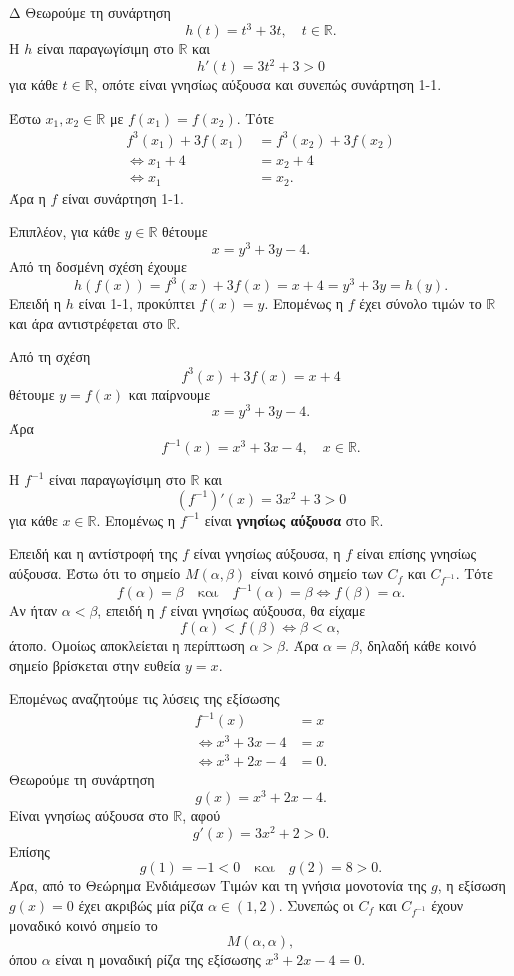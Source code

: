 \begin{thema}{Δ}
Θεωρούμε τη συνάρτηση
\[
h(t)=t^3+3t,\quad t\in\mathbb{R}.
\]
Η $h$ είναι παραγωγίσιμη στο $\mathbb{R}$ και
\[
h'(t)=3t^2+3>0
\]
για κάθε $t\in\mathbb{R}$, οπότε είναι γνησίως αύξουσα και συνεπώς συνάρτηση 1-1.
\begin{erwthma}
\item Έστω $x_1,x_2\in\mathbb{R}$ με $f(x_1)=f(x_2)$. Τότε
\begin{align*}
f^3(x_1)+3f(x_1)&=f^3(x_2)+3f(x_2)\\
\Leftrightarrow x_1+4&=x_2+4\\
\Leftrightarrow x_1&=x_2.
\end{align*}
Άρα η $f$ είναι συνάρτηση 1-1.

Επιπλέον, για κάθε $y\in\mathbb{R}$ θέτουμε
\[
x=y^3+3y-4.
\]
Από τη δοσμένη σχέση έχουμε
\[
h(f(x))=f^3(x)+3f(x)=x+4=y^3+3y=h(y).
\]
Επειδή η $h$ είναι 1-1, προκύπτει $f(x)=y$. Επομένως η $f$ έχει σύνολο τιμών το $\mathbb{R}$ και άρα αντιστρέφεται στο $\mathbb{R}$.

Από τη σχέση
\[
f^3(x)+3f(x)=x+4
\]
θέτουμε $y=f(x)$ και παίρνουμε
\[
x=y^3+3y-4.
\]
Άρα
\[
{f^{-1}(x)=x^3+3x-4,\quad x\in\mathbb{R}}.
\]

\item Η $f^{-1}$ είναι παραγωγίσιμη στο $\mathbb{R}$ και
\[
\left(f^{-1}\right)'(x)=3x^2+3>0
\]
για κάθε $x\in\mathbb{R}$. Επομένως η $f^{-1}$ είναι \textbf{γνησίως αύξουσα} στο $\mathbb{R}$.

Επειδή και η αντίστροφή της $f$ είναι γνησίως αύξουσα, η $f$ είναι επίσης γνησίως αύξουσα. Έστω ότι το σημείο $M(\alpha,\beta)$ είναι κοινό σημείο των $C_f$ και $C_{f^{-1}}$. Τότε
\[
f(\alpha)=\beta
\quad\text{και}\quad
f^{-1}(\alpha)=\beta\Leftrightarrow f(\beta)=\alpha.
\]
Αν ήταν $\alpha<\beta$, επειδή η $f$ είναι γνησίως αύξουσα, θα είχαμε
\[
f(\alpha)<f(\beta)\Leftrightarrow \beta<\alpha,
\]
άτοπο. Ομοίως αποκλείεται η περίπτωση $\alpha>\beta$. Άρα $\alpha=\beta$, δηλαδή κάθε κοινό σημείο βρίσκεται στην ευθεία $y=x$.

Επομένως αναζητούμε τις λύσεις της εξίσωσης
\begin{align*}
f^{-1}(x)&=x\\
\Leftrightarrow x^3+3x-4&=x\\
\Leftrightarrow x^3+2x-4&=0.
\end{align*}
Θεωρούμε τη συνάρτηση
\[
g(x)=x^3+2x-4.
\]
Είναι γνησίως αύξουσα στο $\mathbb{R}$, αφού
\[
g'(x)=3x^2+2>0.
\]
Επίσης
\[
g(1)=-1<0
\quad\text{και}\quad
g(2)=8>0.
\]
Άρα, από το Θεώρημα Ενδιάμεσων Τιμών και τη γνήσια μονοτονία της $g$, η εξίσωση $g(x)=0$ έχει ακριβώς μία ρίζα $\alpha\in(1,2)$. Συνεπώς οι $C_f$ και $C_{f^{-1}}$ έχουν μοναδικό κοινό σημείο το
\[
{M(\alpha,\alpha)},
\]
όπου $\alpha$ είναι η μοναδική ρίζα της εξίσωσης $x^3+2x-4=0$.


\end{erwthma}
\end{thema}
